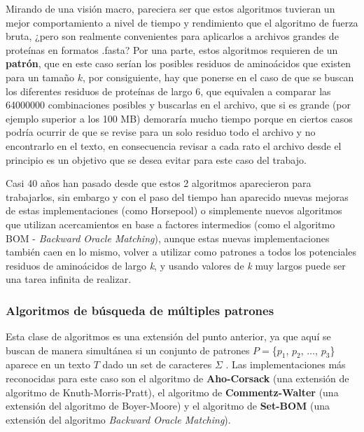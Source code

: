 Mirando de una visión macro, pareciera ser que estos algoritmos tuvieran un mejor comportamiento a nivel de tiempo y rendimiento que el algoritmo de fuerza bruta, ¿pero son realmente convenientes para aplicarlos a archivos grandes de proteínas en formatos .fasta? Por una parte, estos algoritmos requieren de un \textbf{patrón}, que en este caso serían los posibles residuos de aminoácidos que existen para un tamaño $k$, por consiguiente, hay que ponerse en el caso de que se buscan los diferentes residuos de proteínas de largo 6, que equivalen a comparar las 64000000 combinaciones posibles y buscarlas en el archivo, que si es grande (por ejemplo superior a los 100 MB) demoraría mucho tiempo porque en ciertos casos podría ocurrir de que se revise para un solo residuo todo el archivo y no encontrarlo en el texto, en consecuencia revisar a cada rato el archivo desde el principio es un objetivo que se desea evitar para este caso del trabajo.

Casi 40 años han pasado desde que estos 2 algoritmos aparecieron para trabajarlos, sin embargo y con el paso del tiempo han aparecido nuevas mejoras de estas implementaciones (como Horsepool) o simplemente nuevos algoritmos que utilizan acercamientos en base a factores intermedios (como el algoritmo BOM - \textit{Backward Oracle Matching}), aunque estas nuevas implementaciones también caen en lo mismo, volver a utilizar como patrones a todos los potenciales residuos de aminoácidos de largo \textit{k}, y usando valores de \textit{k} muy largos puede ser una tarea infinita de realizar.

\subsubsection{Algoritmos de búsqueda de múltiples patrones}

Esta clase de algoritmos es una extensión del punto anterior, ya que aquí se buscan de manera simultánea si un conjunto de patrones $P=$\{$p_{1}$, $p_{2}$, $\ldots$, $p_{3}$\} aparece en un texto $T$ dado un set de caracteres $\Sigma$ \cite{stringmatching}. Las implementaciones más reconocidas para este caso son el algoritmo de \textbf{Aho-Corsack} (una extensión de algoritmo de Knuth-Morris-Pratt), el algoritmo de \textbf{Commentz-Walter} (una extensión del algoritmo de Boyer-Moore) y el algoritmo de \textbf{Set-BOM} (una extensión del algoritmo \textit{Backward Oracle Matching}). 


